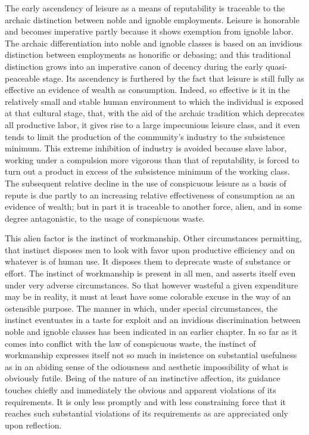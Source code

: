 \documentclass[12pt]{report}
\begin{document}
The early ascendency of leisure as a means of reputability is traceable
to the archaic distinction between noble and ignoble employments.
Leisure is honorable and becomes imperative partly because it shows
exemption from ignoble labor. The archaic differentiation into noble and
ignoble classes is based on an invidious distinction between employments
as honorific or debasing; and this traditional distinction grows into an
imperative canon of decency during the early quasi-peaceable stage.
Its ascendency is furthered by the fact that leisure is still fully as
effective an evidence of wealth as consumption. Indeed, so effective
is it in the relatively small and stable human environment to which the
individual is exposed at that cultural stage, that, with the aid of the
archaic tradition which deprecates all productive labor, it gives rise
to a large impecunious leisure class, and it even tends to limit the
production of the community's industry to the subsistence minimum. This
extreme inhibition of industry is avoided because slave labor, working
under a compulsion more vigorous than that of reputability, is forced to
turn out a product in excess of the subsistence minimum of the working
class. The subsequent relative decline in the use of conspicuous
leisure as a basis of repute is due partly to an increasing relative
effectiveness of consumption as an evidence of wealth; but in part it is
traceable to another force, alien, and in some degree antagonistic, to
the usage of conspicuous waste.

This alien factor is the instinct of workmanship. Other circumstances
permitting, that instinct disposes men to look with favor upon
productive efficiency and on whatever is of human use. It disposes them
to deprecate waste of substance or effort. The instinct of workmanship
is present in all men, and asserts itself even under very adverse
circumstances. So that however wasteful a given expenditure may be in
reality, it must at least have some colorable excuse in the way of an
ostensible purpose. The manner in which, under special circumstances,
the instinct eventuates in a taste for exploit and an invidious
discrimination between noble and ignoble classes has been indicated in
an earlier chapter. In so far as it comes into conflict with the law of
conspicuous waste, the instinct of workmanship expresses itself not so
much in insistence on substantial usefulness as in an abiding sense of
the odiousness and aesthetic impossibility of what is obviously futile.
Being of the nature of an instinctive affection, its guidance touches
chiefly and immediately the obvious and apparent violations of its
requirements. It is only less promptly and with less constraining force
that it reaches such substantial violations of its requirements as are
appreciated only upon reflection.
\end{document}
